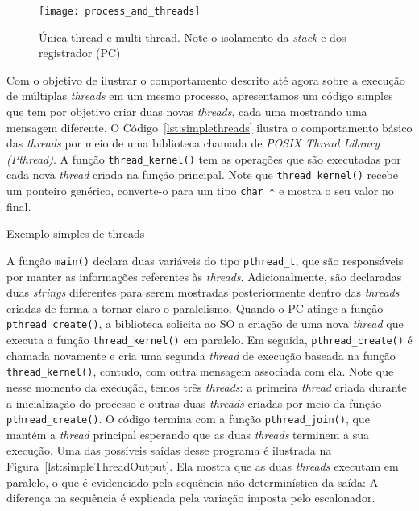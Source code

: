 \begin{figure}[!h]
  \centering
  \texttt{[image: process\_and\_threads]}
	\caption[Única thread e multi-thread.]{Única thread e multi-thread. Note o isolamento da \emph{stack} e dos registrador (PC)~\citep{silberschatz}}
  \label{fig:single_thread_multi_thread}
\end{figure}

Com o objetivo de ilustrar o comportamento descrito até agora sobre a execução
de múltiplas \emph{threads} em um mesmo processo, apresentamos um código
simples que tem por objetivo criar duas novas \emph{threads}, cada uma mostrando
uma mensagem diferente. O Código~\ref{lst:simplethreads} ilustra o
comportamento básico das \emph{threads} por meio de uma biblioteca chamada de
\emph{POSIX Thread Library (Pthread)}. A função
\texttt{thread\_kernel()} tem as operações que são executadas por cada nova
\emph{thread} criada na função principal. Note que \texttt{thread\_kernel()}
recebe um ponteiro genérico, converte-o para um tipo \texttt{char *} e
mostra o seu valor no final.

\begin{ruledcaption}{Exemplo simples de threads\label{lst:simplethreads}}

\end{ruledcaption}

A função \texttt{main()} declara duas variáveis do tipo \texttt{pthread\_t},
que são responsáveis por manter as informações referentes às \emph{threads}.
Adicionalmente, são declaradas duas \emph{strings} diferentes para serem
mostradas posteriormente dentro das \emph{threads} criadas de forma a
tornar claro o paralelismo. Quando o PC atinge a função
\texttt{pthread\_create()}, a biblioteca solicita ao SO a criação de uma nova
\emph{thread} que executa a função \texttt{thread\_kernel()} em paralelo. Em
seguida, \texttt{pthread\_create()} é chamada novamente e cria uma segunda
\emph{thread} de execução baseada na função \texttt{thread\_kernel()}, contudo,
com outra mensagem associada com ela. Note que nesse momento da execução, temos
três \emph{threads}: a primeira \emph{thread} criada durante a inicialização do
processo e outras duas \emph{threads} criadas por meio da função
\texttt{pthread\_create()}. O código termina com a função
\texttt{pthread\_join()}, que mantém a \emph{thread} principal esperando que as
duas \emph{threads} terminem a sua execução. Uma das possíveis saídas desse
programa é ilustrada na Figura~\ref{lst:simpleThreadOutput}. Ela mostra que as
duas \emph{threads} executam em paralelo, o que é evidenciado pela sequência não
determinística da saída: A diferença na sequência é explicada pela variação
imposta pelo escalonador.

